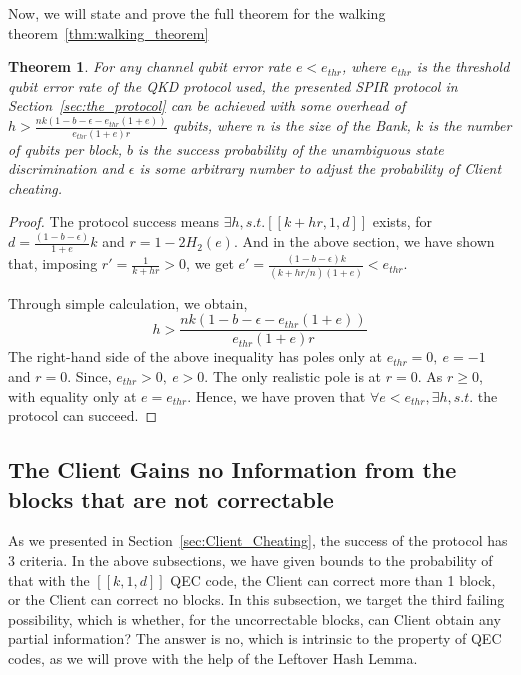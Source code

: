 \documentclass[%
 reprint,
superscriptaddress,
 amsmath,amssymb,
 aps,
]{revtex4-2}
\newtheorem{theorem}{Theorem}[section]
\begin{document}
Now, we will state and prove the full theorem for the walking theorem~\ref{thm:walking_theorem}

\begin{theorem}
    For any channel qubit error rate $e<e_{thr}$, where $e_{thr}$ is the threshold qubit error rate of the QKD protocol used, the presented SPIR protocol in Section~\ref{sec:the_protocol} can be achieved with some overhead of $h >\frac{nk(1-b-\epsilon-e_{thr}(1+e))}{e_{thr}(1+e)r}$ qubits, where $n$ is the size of the Bank, $k$ is the number of qubits per block, $b$ is the success probability of the unambiguous state discrimination and $\epsilon$ is some arbitrary number to adjust the probability of Client cheating.
\label{thm:success_protocol}
\end{theorem}

\begin{proof}
    The protocol success means $\exists h, s.t. [[k+hr, 1, d]]$ exists, for $d=\frac{(1-b-\epsilon)}{1+e}k$ and $r=1-2H_2(e)$. And in the above section, we have shown that, imposing $r'=\frac{1}{k+hr}>0$, we get $e'=\frac{(1-b-\epsilon)k}{(k+hr/n)(1+e)}<e_{thr}$.

    Through simple calculation, we obtain,
    \begin{equation}
         h>\frac{nk(1-b-\epsilon-e_{thr}(1+e))}{e_{thr}(1+e)r}
    \end{equation}
    The right-hand side of the above inequality has poles only at $e_{thr}=0,\ e=-1$ and $r=0$. Since, $e_{thr}>0,\ e>0$. The only realistic pole is at $r=0$. As $r\ge0$, with equality only at $e=e_{thr}$. Hence, we have proven that $\forall e<e_{thr}, \exists h, s.t.$ the protocol can succeed.
\end{proof}

\subsection{The Client Gains no Information from the blocks that are not correctable}

As we presented in Section~\ref{sec:Client_Cheating}, the success of the protocol has 3 criteria. In the above subsections, we have given bounds to the probability of that with the $[[k, 1, d]]$ QEC code, the Client can correct more than 1 block, or the Client can correct no blocks. In this subsection, we target the third failing possibility, which is whether, for the uncorrectable blocks, can Client obtain any partial information? The answer is no, which is intrinsic to the property of QEC codes, as we will prove with the help of the Leftover Hash Lemma.
\end{document}
